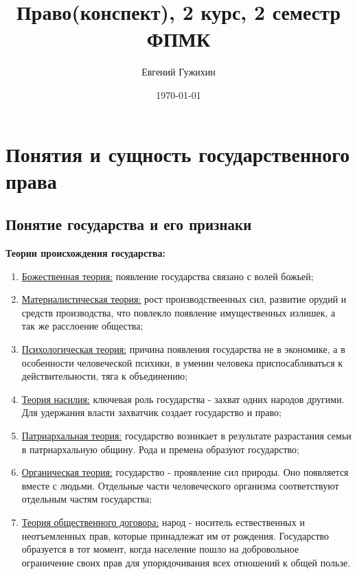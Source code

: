 \documentclass[a5paper,10pt]{article}
\author{Евгений Гужихин}
\title{Право(конспект), 2 курс, 2 семестр ФПМК}
\date{\today}
\begin{document}
	\maketitle
	\tableofcontents{}
	\newpage

	\section{Понятия и сущность государственного права}
		\subsection{Понятие государства и его признаки}
			\textbf{Теории происхождения государства:}
			\begin{enumerate}
				\item \underline{Божественная теория:} появление государства связано с волей божьей;
				
				\item \underline{Материалистическая теория:} рост производствеенных сил, развитие орудий и средств производства, что повлекло появление имущественных излишек, а так же расслоение общества;
				
				\item \underline{Психологическая теория:} причина появления государства не в экономике, а в особенности человеческой психики, в умении человека приспосабливаться к действительности, тяга к объединению;
				
				\item \underline{Теория насилия:} ключевая роль государства - захват одних народов другими. Для удержания власти захватчик создает государство и право;
				
				\item \underline{Патриархальная теория:} государство возникает в результате разрастания семьи в патриархальную общину. Рода и премена образуют государство;
				
				\item \underline{Органическая теория:} государство - проявление сил природы. Оно появляется вместе с людьми. Отдельные части человеческого организма соответствуют отдельным частям государства;
				
				\item \underline{Теория общественного договора:} народ - носитель ествественных и неотъемленных прав, которые принадлежат им от рождения. Государство образуется в тот момент, когда население пошло на добровольное ограничение своих прав для упорядочивания всех отношений к общей пользе.
			\end{enumerate}
\end{document}

